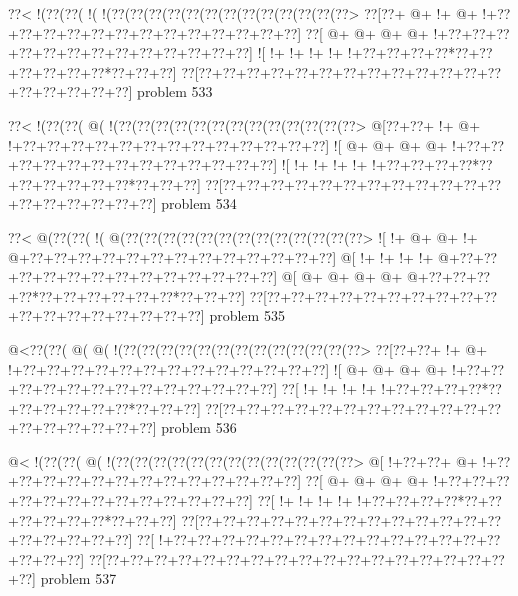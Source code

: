 \vbox{\vbox{\goo
\0??<\- !(\0??(\0??(\- !(\- !(\0??(\0??(\0??(\0??(\0??(\0??(\0??(\0??(\0??(\0??(\0??(\0??(\0??>
\0??[\0??+\- @+\- !+\- @+\- !+\0??+\0??+\0??+\0??+\0??+\0??+\0??+\0??+\0??+\0??+\0??+\0??+\0??]
\0??[\- @+\- @+\- @+\- @+\- !+\0??+\0??+\0??+\0??+\0??+\0??+\0??+\0??+\0??+\0??+\0??+\0??+\0??]
\- ![\- !+\- !+\- !+\- !+\- !+\0??+\0??+\0??+\0??*\0??+\0??+\0??+\0??+\0??+\0??*\0??+\0??+\0??]
\0??[\0??+\0??+\0??+\0??+\0??+\0??+\0??+\0??+\0??+\0??+\0??+\0??+\0??+\0??+\0??+\0??+\0??+\0??]
}
\hfil problem 533\hfil\break
}



\vbox{\vbox{\goo
\0??<\- !(\0??(\0??(\- @(\- !(\0??(\0??(\0??(\0??(\0??(\0??(\0??(\0??(\0??(\0??(\0??(\0??(\0??>
\- @[\0??+\0??+\- !+\- @+\- !+\0??+\0??+\0??+\0??+\0??+\0??+\0??+\0??+\0??+\0??+\0??+\0??+\0??]
\- ![\- @+\- @+\- @+\- @+\- !+\0??+\0??+\0??+\0??+\0??+\0??+\0??+\0??+\0??+\0??+\0??+\0??+\0??]
\- ![\- !+\- !+\- !+\- !+\- !+\0??+\0??+\0??+\0??*\0??+\0??+\0??+\0??+\0??+\0??*\0??+\0??+\0??]
\0??[\0??+\0??+\0??+\0??+\0??+\0??+\0??+\0??+\0??+\0??+\0??+\0??+\0??+\0??+\0??+\0??+\0??+\0??]
}
\hfil problem 534\hfil\break
}



\vbox{\vbox{\goo
\0??<\- @(\0??(\0??(\- !(\- @(\0??(\0??(\0??(\0??(\0??(\0??(\0??(\0??(\0??(\0??(\0??(\0??(\0??>
\- ![\- !+\- @+\- @+\- !+\- @+\0??+\0??+\0??+\0??+\0??+\0??+\0??+\0??+\0??+\0??+\0??+\0??+\0??]
\- @[\- !+\- !+\- !+\- !+\- @+\0??+\0??+\0??+\0??+\0??+\0??+\0??+\0??+\0??+\0??+\0??+\0??+\0??]
\- @[\- @+\- @+\- @+\- @+\- @+\0??+\0??+\0??+\0??*\0??+\0??+\0??+\0??+\0??+\0??*\0??+\0??+\0??]
\0??[\0??+\0??+\0??+\0??+\0??+\0??+\0??+\0??+\0??+\0??+\0??+\0??+\0??+\0??+\0??+\0??+\0??+\0??]
}
\hfil problem 535\hfil\break
}



\vbox{\vbox{\goo
\- @<\0??(\0??(\- @(\- @(\- !(\0??(\0??(\0??(\0??(\0??(\0??(\0??(\0??(\0??(\0??(\0??(\0??(\0??>
\0??[\0??+\0??+\- !+\- @+\- !+\0??+\0??+\0??+\0??+\0??+\0??+\0??+\0??+\0??+\0??+\0??+\0??+\0??]
\- ![\- @+\- @+\- @+\- @+\- !+\0??+\0??+\0??+\0??+\0??+\0??+\0??+\0??+\0??+\0??+\0??+\0??+\0??]
\0??[\- !+\- !+\- !+\- !+\- !+\0??+\0??+\0??+\0??*\0??+\0??+\0??+\0??+\0??+\0??*\0??+\0??+\0??]
\0??[\0??+\0??+\0??+\0??+\0??+\0??+\0??+\0??+\0??+\0??+\0??+\0??+\0??+\0??+\0??+\0??+\0??+\0??]
}
\hfil problem 536\hfil\break
}



\vbox{\vbox{\goo
\- @<\- !(\0??(\0??(\- @(\- !(\0??(\0??(\0??(\0??(\0??(\0??(\0??(\0??(\0??(\0??(\0??(\0??(\0??>
\- @[\- !+\0??+\0??+\- @+\- !+\0??+\0??+\0??+\0??+\0??+\0??+\0??+\0??+\0??+\0??+\0??+\0??+\0??]
\0??[\- @+\- @+\- @+\- @+\- !+\0??+\0??+\0??+\0??+\0??+\0??+\0??+\0??+\0??+\0??+\0??+\0??+\0??]
\0??[\- !+\- !+\- !+\- !+\- !+\0??+\0??+\0??+\0??*\0??+\0??+\0??+\0??+\0??+\0??*\0??+\0??+\0??]
\0??[\0??+\0??+\0??+\0??+\0??+\0??+\0??+\0??+\0??+\0??+\0??+\0??+\0??+\0??+\0??+\0??+\0??+\0??]
\0??[\- !+\0??+\0??+\0??+\0??+\0??+\0??+\0??+\0??+\0??+\0??+\0??+\0??+\0??+\0??+\0??+\0??+\0??]
\0??[\0??+\0??+\0??+\0??+\0??+\0??+\0??+\0??+\0??+\0??+\0??+\0??+\0??+\0??+\0??+\0??+\0??+\0??]
}
\hfil problem 537\hfil\break
}



